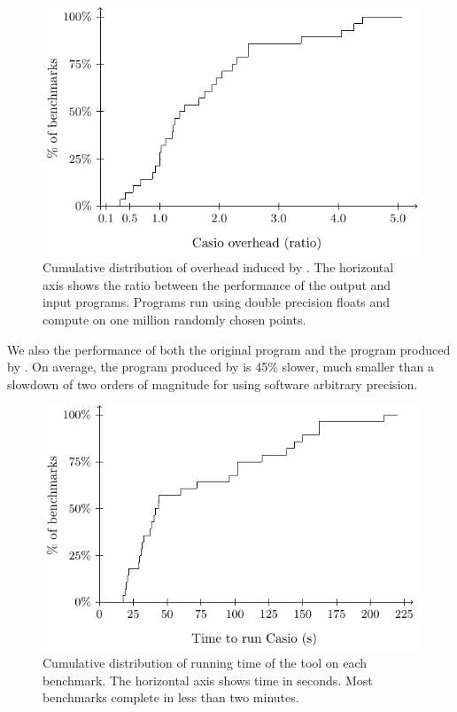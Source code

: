 \documentclass[paper.tex]{subfiles}
\begin{document}
\begin{figure}
  \centering
  \includegraphics[width=0.9\columnwidth]{fig/eval-overhead-d.pdf}
  \caption{Cumulative distribution of overhead induced by \casio. The
    horizontal axis shows the ratio between the performance of the
    output and input programs. Programs run using double precision
    floats and compute on one million randomly chosen points.}
  \label{fig:eval-overhead}
\end{figure}

We also the performance of both the original program and the program
produced by \casio. On average, the program produced by \casio is 45\% slower,
much smaller than a slowdown of two orders of magnitude for using
software arbitrary precision.

\begin{figure}
\includegraphics[width=0.9\columnwidth]{fig/eval-casio-time.pdf}
\caption{Cumulative distribution of running time of the \casio tool on
  each benchmark. The horizontal axis shows time in seconds. Most
  benchmarks complete in less than two minutes.}
\label{fig:eval-casio-time}
\end{figure}
\end{document}
